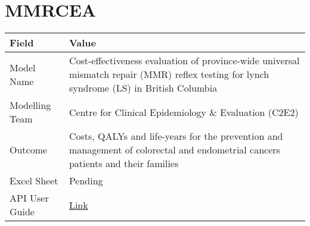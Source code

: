 \documentclass[
]{book}
\begin{document}
\hypertarget{mmrcea}{%
\chapter{MMRCEA}\label{mmrcea}}

\begin{longtable}[]{@{}ll@{}}
\toprule
\begin{minipage}[b]{0.45\columnwidth}\raggedright
Field\strut
\end{minipage} & \begin{minipage}[b]{0.49\columnwidth}\raggedright
Value\strut
\end{minipage}\tabularnewline
\midrule
\endhead
\begin{minipage}[t]{0.45\columnwidth}\raggedright
Model Name\strut
\end{minipage} & \begin{minipage}[t]{0.49\columnwidth}\raggedright
Cost-effectiveness evaluation of province-wide universal mismatch repair (MMR) reflex testing for lynch syndrome (LS) in British Columbia\strut
\end{minipage}\tabularnewline
\begin{minipage}[t]{0.45\columnwidth}\raggedright
Modelling Team\strut
\end{minipage} & \begin{minipage}[t]{0.49\columnwidth}\raggedright
Centre for Clinical Epidemiology \& Evaluation (C2E2)\strut
\end{minipage}\tabularnewline
\begin{minipage}[t]{0.45\columnwidth}\raggedright
Outcome\strut
\end{minipage} & \begin{minipage}[t]{0.49\columnwidth}\raggedright
Costs, QALYs and life-years for the prevention and management of colorectal and endometrial cancers patients and their families\strut
\end{minipage}\tabularnewline
\begin{minipage}[t]{0.45\columnwidth}\raggedright
Excel Sheet\strut
\end{minipage} & \begin{minipage}[t]{0.49\columnwidth}\raggedright
Pending\strut
\end{minipage}\tabularnewline
\begin{minipage}[t]{0.45\columnwidth}\raggedright
API User Guide\strut
\end{minipage} & \begin{minipage}[t]{0.49\columnwidth}\raggedright
\href{https://resplab.github.io/prismguide/api-users-guide.html\#mmrcea}{Link}\strut
\end{minipage}\tabularnewline
\bottomrule
\end{longtable}
\end{document}

